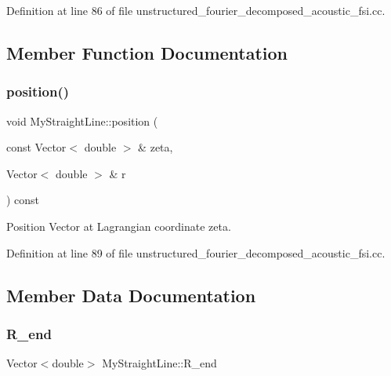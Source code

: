 Definition at line 86 of file unstructured\+\_\+fourier\+\_\+decomposed\+\_\+acoustic\+\_\+fsi.\+cc.



\subsection{Member Function Documentation}
\mbox{\label{classMyStraightLine_ae3ee51a7b81acc2ef652bec4ee955d2f}} 
\subsubsection{\texorpdfstring{position()}{position()}}
{\footnotesize\ttfamily void My\+Straight\+Line\+::position (\begin{DoxyParamCaption}\item[{const Vector$<$ double $>$ \&}]{zeta,  }\item[{Vector$<$ double $>$ \&}]{r }\end{DoxyParamCaption}) const\hspace{0.3cm}{\ttfamily [inline]}}



Position Vector at Lagrangian coordinate zeta. 



Definition at line 89 of file unstructured\+\_\+fourier\+\_\+decomposed\+\_\+acoustic\+\_\+fsi.\+cc.



\subsection{Member Data Documentation}
\mbox{\label{classMyStraightLine_afa466e12301ccea99a02fe1bde615691}} 
\subsubsection{\texorpdfstring{R\+\_\+end}{R\_end}}
{\footnotesize\ttfamily Vector$<$double$>$ My\+Straight\+Line\+::\+R\+\_\+end\hspace{0.3cm}{\ttfamily [private]}}



